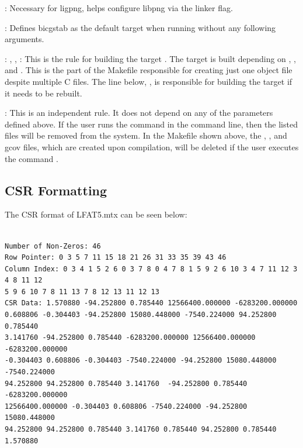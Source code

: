 \documentclass[12pt]{article}
\begin{document}
: Necessary for ligpng, helps configure libpng via the linker flag.

: Defines bicgstab as the default target when running  without any following arguments.

: , , : This is the rule for building the target . The target is built depending on , , and . This is the part of the Makefile responsible for creating just one object file despite multiple C files. The line below, , is responsible for building the target if it needs to be rebuilt.

: This is an independent rule. It does not depend on any of the parameters defined above. If the user runs the command  in the command line, then the listed files will be removed from the system. In the Makefile shown above, the , , and gcov files, which are created upon compilation, will be deleted if the user executes the command .

\subsection{CSR Formatting}

The CSR format of LFAT5.mtx can be seen below:

 	\begin{mdframed}[style=myboxstyleTerminal1]
		\begin{verbatim}

Number of Non-Zeros: 46
Row Pointer: 0 3 5 7 11 15 18 21 26 31 33 35 39 43 46 
Column Index: 0 3 4 1 5 2 6 0 3 7 8 0 4 7 8 1 5 9 2 6 10 3 4 7 11 12 3 4 8 11 12
5 9 6 10 7 8 11 13 7 8 12 13 11 12 13 
CSR Data: 1.570880 -94.252800 0.785440 12566400.000000 -6283200.000000 
0.608806 -0.304403 -94.252800 15080.448000 -7540.224000 94.252800 0.785440
3.141760 -94.252800 0.785440 -6283200.000000 12566400.000000 -6283200.000000 
-0.304403 0.608806 -0.304403 -7540.224000 -94.252800 15080.448000 -7540.224000
94.252800 94.252800 0.785440 3.141760  -94.252800 0.785440 -6283200.000000
12566400.000000 -0.304403 0.608806 -7540.224000 -94.252800 15080.448000 
94.252800 94.252800 0.785440 3.141760 0.785440 94.252800 0.785440 1.570880

		\end{verbatim}
	\end{mdframed}
\end{document}
